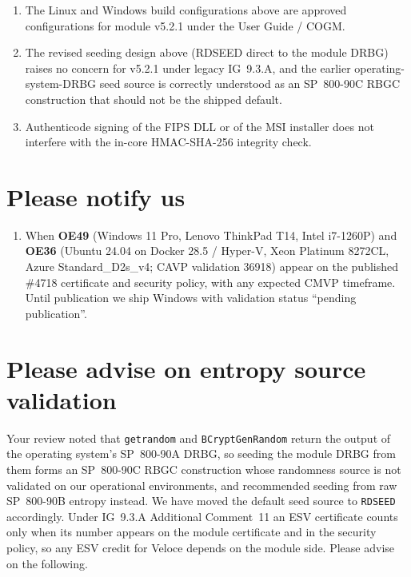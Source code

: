 \documentclass[10pt]{article}
\newcommand{\code}[1]{\texttt{\small #1}}
\begin{document}
\begin{enumerate}
  \item The Linux and Windows build configurations above are approved
        configurations for module v5.2.1 under the User Guide / COGM.
  \item The revised seeding design above (RDSEED direct to the module
        DRBG) raises no concern for v5.2.1 under legacy IG~9.3.A, and the
        earlier operating-system-DRBG seed source is correctly understood as
        an SP~800-90C RBGC construction that should not be the shipped
        default.
  \item Authenticode signing of the FIPS DLL or of the MSI installer does
        not interfere with the in-core HMAC-SHA-256 integrity check.
\end{enumerate}

\section{Please notify us}

\begin{enumerate}
  \item When \textbf{OE49} (Windows 11 Pro, Lenovo ThinkPad T14, Intel
        i7-1260P) and \textbf{OE36} (Ubuntu 24.04 on Docker 28.5 / Hyper-V,
        Xeon Platinum 8272CL, Azure Standard\_D2s\_v4; CAVP validation
        36918) appear on the published \#4718 certificate and security
        policy, with any expected CMVP timeframe. Until publication we ship
        Windows with validation status ``pending publication''.
\end{enumerate}

\section{Please advise on entropy source validation}

Your review noted that \code{getrandom} and \code{BCryptGenRandom} return the
output of the operating system's SP~800-90A DRBG, so seeding the module DRBG
from them forms an SP~800-90C RBGC construction whose randomness source is
not validated on our operational environments, and recommended seeding from
raw SP~800-90B entropy instead. We have moved the default seed source to
\code{RDSEED} accordingly. Under IG~9.3.A Additional Comment~11 an ESV
certificate counts only when its number appears on the module certificate
and in the security policy, so any ESV credit for Veloce depends on the
module side. Please advise on the following.
\end{document}
